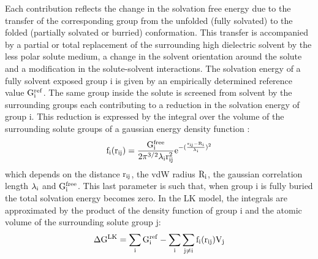 \documentclass[12pt]{report}
\begin{document}
Each contribution reflects the change in the solvation free energy due to the transfer of  the corresponding group from the
unfolded (fully solvated) to the folded (partially solvated or burried) conformation. This transfer is accompanied by a partial
or total replacement of the surrounding high dielectric solvent by the less polar solute medium, a change in the solvent
orientation around the solute and a modification in the solute-solvent interactions. The solvation energy of a fully solvent
exposed group i is given by an empirically determined reference value $\rm G_i^{ref}$. The same group inside the solute is
screened from solvent by the surrounding groups each contributing to a reduction in the solvation energy of group i. This
reduction is expressed by the integral over the volume of the surrounding solute groups of a gaussian energy density function :
\begin{equation}
\rm f_i(r_{ij}) = \frac{G_i^{free}}{2 \pi^{3/2}\lambda_i r_{ij}^2} e^{-(\frac{r_{ij}-R_i}{\lambda_i})^2}
\end{equation}
which depends on the distance $\rm r_{ij}$, the vdW radius $\rm R_i$, the gaussian correlation length $\rm \lambda_i$ and
$\rm G_i^{free}$. This last parameter is such that, when group i is fully buried the total solvation energy becomes zero.
In the LK model, the integrals are approximated by the product of the density function of group i and the atomic volume of the
surrounding solute group j:
\begin{equation}
\rm \Delta G^{LK}  = \sum_i G_i^{ref} - \sum_i \sum_{j \not=i} f_i(r_{ij}) V_j 
\end{equation}
\end{document}
